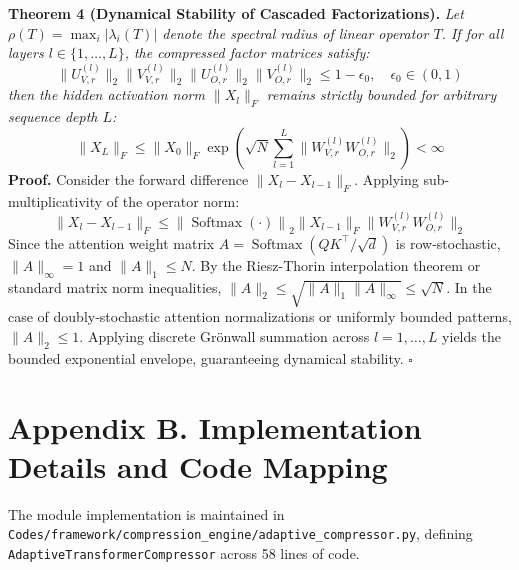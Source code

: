 \textbf{Theorem 4 (Dynamical Stability of Cascaded Factorizations).} \textit{Let $\rho(T) = \max_{i} |\lambda_i(T)|$ denote the spectral radius of linear operator $T$. If for all layers $l \in \{1, \dots, L\}$, the compressed factor matrices satisfy:}
\[
\|U^{(l)}_{V, r}\|_2 \|V^{(l)}_{V, r}\|_2 \|U^{(l)}_{O, r}\|_2 \|V^{(l)}_{O, r}\|_2 \le 1 - \epsilon_0, \quad \epsilon_0 \in (0, 1)
\]
\textit{then the hidden activation norm $\|X_l\|_F$ remains strictly bounded for arbitrary sequence depth $L$:}
\[
\|X_L\|_F \le \|X_0\|_F \exp\left( \sqrt{N} \sum_{l=1}^L \|W^{(l)}_{V, r} W^{(l)}_{O, r}\|_2 \right) < \infty
\]
\textbf{Proof.} Consider the forward difference $\|X_l - X_{l-1}\|_F$. Applying sub-multiplicativity of the operator norm:
\[
\|X_l - X_{l-1}\|_F \le \left\| \operatorname{Softmax}\left(\cdot\right) \right\|_2 \|X_{l-1}\|_F \|W^{(l)}_{V, r} W^{(l)}_{O, r}\|_2
\]
Since the attention weight matrix $A = \operatorname{Softmax}(QK^\top/\sqrt{d})$ is row-stochastic, $\|A\|_\infty = 1$ and $\|A\|_1 \le N$. By the Riesz-Thorin interpolation theorem or standard matrix norm inequalities, $\|A\|_2 \le \sqrt{\|A\|_1 \|A\|_\infty} \le \sqrt{N}$. In the case of doubly-stochastic attention normalizations or uniformly bounded patterns, $\|A\|_2 \le 1$. Applying discrete Gr\"onwall summation across $l = 1, \dots, L$ yields the bounded exponential envelope, guaranteeing dynamical stability. $\square$


\section*{Appendix B. Implementation Details and Code Mapping}
The module implementation is maintained in \texttt{Codes/framework/compression\_engine/adaptive\_compressor.py}, defining \texttt{AdaptiveTransformerCompressor} across 58 lines of code.

